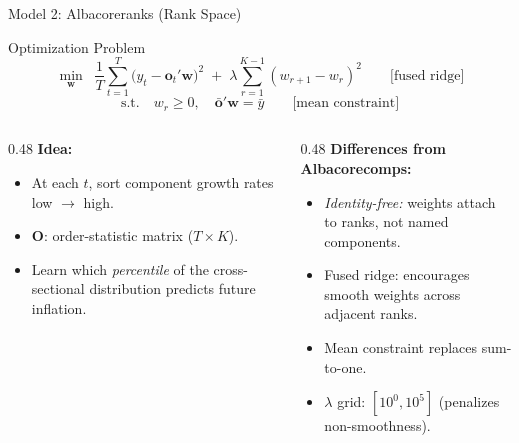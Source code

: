 \documentclass[aspectratio=169, 11pt]{beamer}
\begin{document}
\begin{frame}{Model 2: Albacoreranks (Rank Space)}
  \begin{block}{Optimization Problem}
    \[
      \min_{\mathbf{w}} \;\; \frac{1}{T}\sum_{t=1}^{T}\bigl(y_t - \mathbf{o}_t'\mathbf{w}\bigr)^2
      \;+\; \lambda \sum_{r=1}^{K-1}(w_{r+1} - w_r)^2
      \qquad\text{[fused ridge]}
    \]
    \vspace{-6pt}
    \[
      \text{s.t.} \quad w_r \geq 0, \quad \bar{\mathbf{o}}'\mathbf{w} = \bar{y}
      \qquad\text{[mean constraint]}
    \]
  \end{block}
  \vspace{4pt}
  \begin{columns}[T]
    \begin{column}{0.48\textwidth}
      \textbf{Idea:}
      \begin{itemize}
        \item At each $t$, sort component growth rates low $\to$ high.
        \item $\mathbf{O}$: order-statistic matrix ($T \times K$).
        \item Learn which \emph{percentile} of the cross-sectional
              distribution predicts future inflation.
      \end{itemize}
    \end{column}
    \begin{column}{0.48\textwidth}
      \textbf{Differences from Albacorecomps:}
      \begin{itemize}
        \item \emph{Identity-free:} weights attach to ranks, not named components.
        \item Fused ridge: encourages smooth weights across adjacent ranks.
        \item Mean constraint replaces sum-to-one.
        \item $\lambda$ grid: $[10^{0}, 10^{5}]$ (penalizes non-smoothness).
      \end{itemize}
    \end{column}
  \end{columns}
\end{frame}
\end{document}
